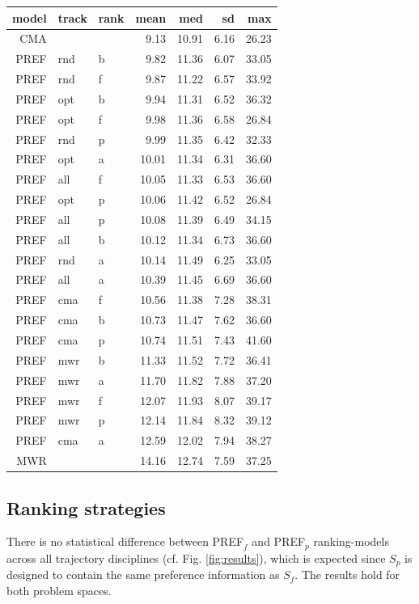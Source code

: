 \documentclass[smallextended]{llncs}
\newcommand{\PREF}[2]{PREF$_{#2}^{#1}$}
\begin{document}
\begin{table}[h!t]
{ {\scriptsize
  \begin{tabular}{rllrrrr}
    \toprule
  model&track&rank& mean & med & sd & max \\ 
    \midrule
  CMA && & 9.13 & 10.91 & 6.16 &  26.23 \\ 
    PREF&rnd&b & 9.82 & 11.36 & 6.07 &  33.05 \\ 
    PREF&rnd&f & 9.87 & 11.22 & 6.57 &  33.92 \\ 
    PREF&opt&b & 9.94 & 11.31 & 6.52 &  36.32 \\ 
    PREF&opt&f & 9.98 & 11.36 & 6.58 &  26.84 \\ 
    PREF&rnd&p & 9.99 & 11.35 & 6.42 &  32.33 \\ 
    PREF&opt&a & 10.01 & 11.34 & 6.31 &  36.60 \\ 
    PREF&all&f & 10.05 & 11.33 & 6.53 &  36.60 \\ 
    PREF&opt&p & 10.06 & 11.42 & 6.52 &  26.84 \\ 
    PREF&all&p & 10.08 & 11.39 & 6.49 &  34.15 \\ 
    PREF&all&b & 10.12 & 11.34 & 6.73 &  36.60 \\ 
    PREF&rnd&a & 10.14 & 11.49 & 6.25 &  33.05 \\ 
    PREF&all&a & 10.39 & 11.45 & 6.69 &  36.60 \\ 
    PREF&cma&f & 10.56 & 11.38 & 7.28 &  38.31 \\ 
    PREF&cma&b & 10.73 & 11.47 & 7.62 &  36.60 \\ 
    PREF&cma&p & 10.74 & 11.51 & 7.43 &  41.60 \\ 
    PREF&mwr&b & 11.33 & 11.52 & 7.72 &  36.41 \\ 
    PREF&mwr&a & 11.70 & 11.82 & 7.88 &  37.20 \\ 
    PREF&mwr&f & 12.07 & 11.93 & 8.07 &  39.17 \\ 
    PREF&mwr&p & 12.14 & 11.84 & 8.32 &  39.12 \\ 
    PREF&cma&a & 12.59 & 12.02 & 7.94 &  38.27 \\ 
    MWR&& & 14.16 & 12.74 & 7.59 & 37.25 \\ 
     \bottomrule
  \end{tabular}
  } 
  }
 \end{table}
 
 
 
\subsection{Ranking strategies}\label{sec:expr:rank}
There is no statistical difference between \PREF{}{f} and \PREF{}{p} ranking-models across all trajectory disciplines (cf. 
Fig. \ref{fig:results}), which is expected since $S_p$ is designed to contain 
the same preference information as $S_f$. The results hold for both problem spaces. 
\end{document}
